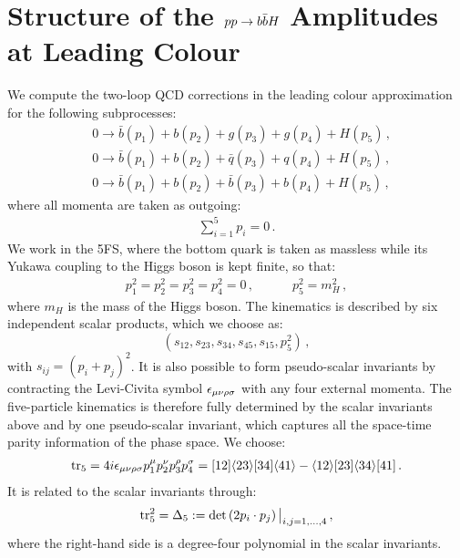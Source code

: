 \documentclass[main.tex]{subfiles}
\begin{document}
\section{Structure of the $pp\to b\bar{b}H$ Amplitudes at Leading Colour}
\label{Hbbsec:amp}
We compute the two-loop QCD corrections in the leading colour approximation for the following subprocesses:
\begin{align} \label{eq:subprocesses}
& 0 \rightarrow \bar{b}(p_1) + b(p_2) + g(p_3) + g(p_4) + H(p_5)\,, \\
& 0 \rightarrow \bar{b}(p_1) + b(p_2) + \bar{q}(p_3) + q(p_4) + H(p_5)\,, \label{eq:subprocessqq} \\
& 0 \rightarrow \bar{b}(p_1) + b(p_2) + \bar{b}(p_3) + b(p_4) + H(p_5) \,, \label{eq:subprocessbb}
\end{align}
where all momenta are taken as outgoing:
\begin{align}
\sum_{i=1}^5 p_i = 0\,.
\end{align}
We work in the 5FS, where the bottom quark is taken as massless while its Yukawa coupling to the Higgs boson is kept finite, so that:
\begin{align}
p_1^2=p_2^2=p_3^2=p_4^2=0\,, \qquad \quad p_5^2=m_H^2\,, 
\end{align}
where $m_H$ is the mass of the Higgs boson. The kinematics is described by six independent scalar products, which we choose as:
\begin{equation}
 (s_{12},s_{23},s_{34},s_{45},s_{15},p_5^2) \,, \nonumber
\end{equation}
with $s_{ij} = (p_i + p_j)^2$. It is also possible to form pseudo-scalar invariants by contracting the Levi-Civita symbol $\epsilon_{\mu \nu \rho \sigma}$ with any four external momenta. The five-particle kinematics is therefore fully determined by the scalar invariants above and by one pseudo-scalar invariant, which captures all the space-time parity information of the phase space. We choose:
\begin{align} \label{eq:tr5}
\text{tr}_5 = 4 i \epsilon_{\mu \nu \rho \sigma} p_1^{\mu} p_2^{\nu} p_3^{\rho} p_4^{\sigma} = [12] \langle23\rangle [34] \langle41\rangle - \langle12\rangle [23] \langle34\rangle [41] \,.
\end{align}
It is related to the scalar invariants through:
\begin{align} \label{eq:tr5squared}
\operatorname{\rm tr}_5^2 =  \Delta_5 := \text{det}\left(2 p_i \cdot p_j \right)\bigl|_{i,j=1,\ldots,4} \,,
\end{align}
where the right-hand side is a degree-four polynomial in the scalar invariants.
\end{document}
